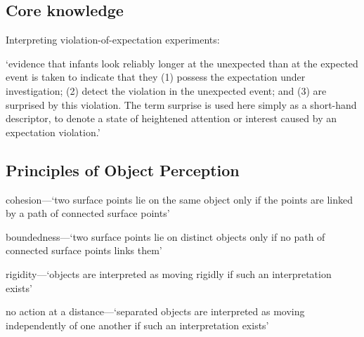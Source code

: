 \documentclass[12pt]{extarticle}
\begin{document}
\begin{multicols}{3}
 
 
\section{Core knowledge}
 
Interpreting violation-of-expectation experiments:
 
‘evidence that infants look reliably longer at the unexpected than at the expected event is taken to indicate that they (1) possess the expectation under investigation; (2) detect the violation in the unexpected event; and (3) are surprised by this violation. The term surprise is used here simply as a short-hand descriptor, to denote a state of heightened attention or interest caused by an expectation violation.’
\citep[p.\ 168]{wang:2004_young}
 
\subsection{Principles of Object Perception \citep{Spelke:1990jn}}
 
cohesion—‘two surface points lie on the same object only if the points are linked by a path of connected surface points’
 
boundedness—‘two surface points lie on distinct objects only if no path of connected surface points links them’
 
rigidity—‘objects are interpreted as moving rigidly if such an interpretation exists’
 
no action at a distance—‘separated objects are interpreted as moving independently of one another if such an interpretation exists’
 
 

 
\footnotesize 


\end{multicols}
\end{document}

